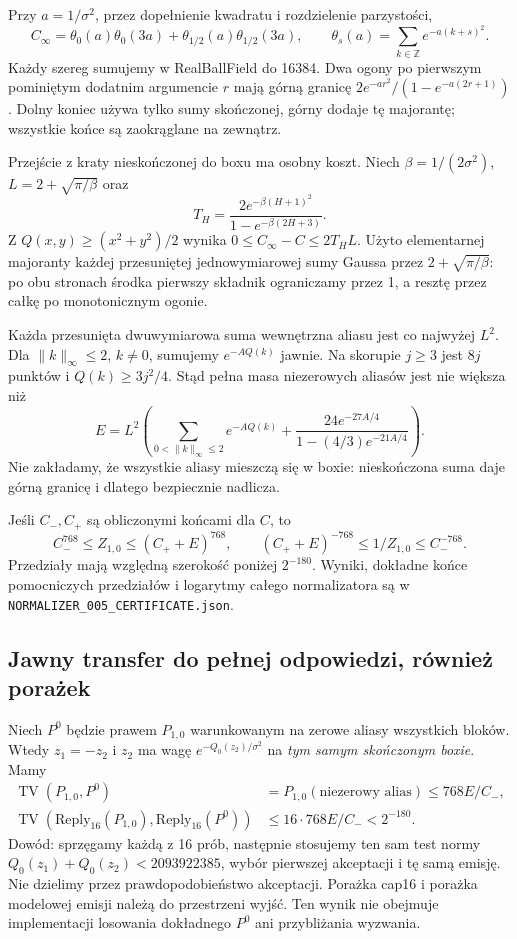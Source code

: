 \documentclass[11pt,a4paper]{article}
\newcommand{\code}[1]{\nolinkurl{#1}}
\newcommand{\TV}{\operatorname{TV}}
\begin{document}
Przy $a=1/\sigma^2$, przez dopełnienie kwadratu i rozdzielenie parzystości,
\[
 C_\infty=\theta_0(a)\theta_0(3a)+\theta_{1/2}(a)\theta_{1/2}(3a),\qquad
 \theta_s(a)=\sum_{k\in\mathbb Z}e^{-a(k+s)^2}.
\]
Każdy szereg sumujemy w RealBallField do 16384. Dwa ogony po pierwszym
pominiętym dodatnim argumencie $r$ mają górną granicę
$2e^{-ar^2}/(1-e^{-a(2r+1)})$. Dolny koniec używa tylko sumy skończonej,
górny dodaje tę majorantę; wszystkie końce są zaokrąglane na zewnątrz.

Przejście z kraty nieskończonej do boxu ma osobny koszt.
Niech $\beta=1/(2\sigma^2)$, $L=2+\sqrt{\pi/\beta}$ oraz
\[
 T_H=\frac{2e^{-\beta(H+1)^2}}{1-e^{-\beta(2H+3)}}.
\]
Z $Q(x,y)\ge(x^2+y^2)/2$ wynika $0\le C_\infty-C\le2T_HL$.
Użyto elementarnej majoranty każdej przesuniętej jednowymiarowej sumy
Gaussa przez $2+\sqrt{\pi/\beta}$: po obu stronach środka pierwszy
składnik ograniczamy przez 1, a resztę przez całkę po monotonicznym ogonie.

Każda przesunięta dwuwymiarowa suma wewnętrzna aliasu jest co najwyżej $L^2$.
Dla $\|k\|_\infty\le2$, $k\ne0$, sumujemy $e^{-AQ(k)}$ jawnie.
Na skorupie $j\ge3$ jest $8j$ punktów i $Q(k)\ge3j^2/4$.
Stąd pełna masa niezerowych aliasów jest nie większa niż
\[
 E=L^2\left(\sum_{0<\|k\|_\infty\le2}e^{-AQ(k)}
 +\frac{24e^{-27A/4}}{1-(4/3)e^{-21A/4}}\right).
\]
Nie zakładamy, że wszystkie aliasy mieszczą się w boxie: nieskończona
suma daje górną granicę i dlatego bezpiecznie nadlicza.

Jeśli $C_-,C_+$ są obliczonymi końcami dla $C$, to
\[
 C_-^{768}\le Z_{1,0}\le(C_++E)^{768},\qquad
 (C_++E)^{-768}\le1/Z_{1,0}\le C_-^{-768}.
\]
Przedziały mają względną szerokość poniżej $2^{-180}$.
Wyniki, dokładne końce pomocniczych przedziałów i logarytmy całego
normalizatora są w \code{NORMALIZER_005_CERTIFICATE.json}.

\subsection*{Jawny transfer do pełnej odpowiedzi, również porażek}
Niech $P^0$ będzie prawem $P_{1,0}$ warunkowanym na zerowe aliasy wszystkich
bloków. Wtedy $z_1=-z_2$ i $z_2$ ma wagę $e^{-Q_0(z_2)/\sigma^2}$
na \emph{tym samym skończonym boxie}. Mamy
\begin{align*}
 \TV(P_{1,0},P^0)&=P_{1,0}(\text{niezerowy alias})\le768E/C_-,\\
 \TV(\mathrm{Reply}_{16}(P_{1,0}),\mathrm{Reply}_{16}(P^0))
 &\le16\cdot768E/C_-<2^{-180}.
\end{align*}
Dowód: sprzęgamy każdą z 16 prób, następnie stosujemy ten sam test normy
$Q_0(z_1)+Q_0(z_2)<2093922385$, wybór pierwszej akceptacji i tę samą emisję.
Nie dzielimy przez prawdopodobieństwo akceptacji. Porażka cap16 i porażka
modelowej emisji należą do przestrzeni wyjść. Ten wynik nie obejmuje
implementacji losowania dokładnego $P^0$ ani przybliżania wyzwania.
\end{document}
